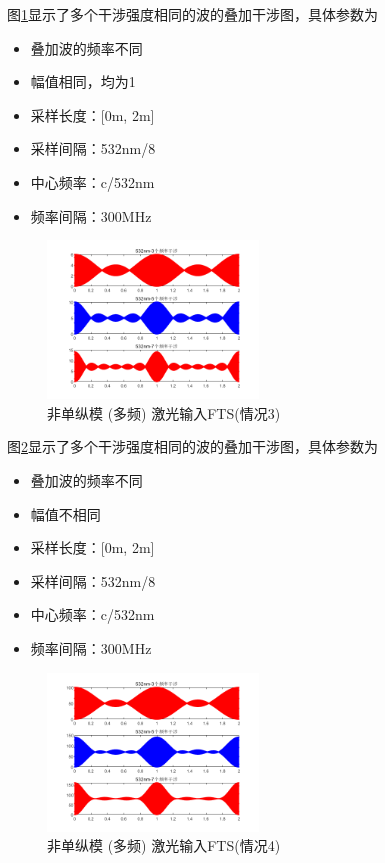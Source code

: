 \documentclass[conference]{IEEEtran}
\begin{document}
图\ref{pic6}显示了多个干涉强度相同的波的叠加干涉图，具体参数为
\begin{itemize}
    \item 叠加波的频率不同
    \item 幅值相同，均为1
    \item  采样长度：[0m, 2m]
    \item 采样间隔：532nm/8
    \item 中心频率：c/532nm
    \item 频率间隔：300MHz
\end{itemize}
\begin{figure}[htbp]
    \centerline{\includegraphics[width=0.5\textwidth]{pic6.png}}
    \caption{非单纵模 (多频) 激光输入FTS(情况3)}
    \label{pic6}
\end{figure}
图\ref{pic7}显示了多个干涉强度相同的波的叠加干涉图，具体参数为
\begin{itemize}
    \item 叠加波的频率不同
    \item 幅值不相同
    \item 采样长度：[0m, 2m]
    \item 采样间隔：532nm/8
    \item 中心频率：c/532nm
    \item 频率间隔：300MHz
\end{itemize}
\begin{figure}[htbp]
    \centerline{\includegraphics[width=0.5\textwidth]{pic7.png}}
    \caption{非单纵模 (多频) 激光输入FTS(情况4)}
    \label{pic7}
\end{figure}
\end{document}
